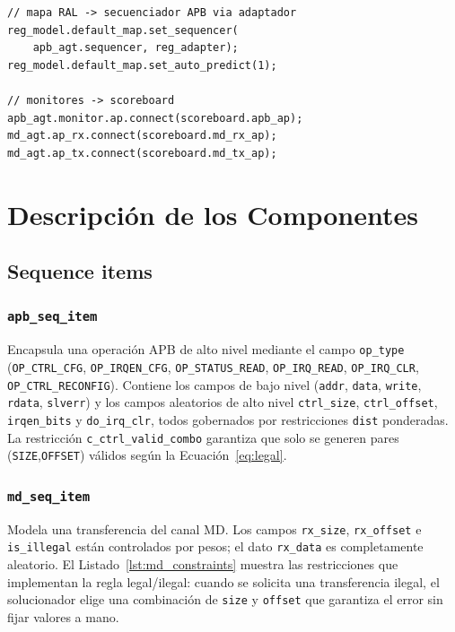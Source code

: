 \documentclass[conference]{IEEEtran}
\begin{document}
\begin{lstlisting}[caption={Conexiones del RAL y los puertos de análisis en el environment},label={lst:env}]
// mapa RAL -> secuenciador APB via adaptador
reg_model.default_map.set_sequencer(
    apb_agt.sequencer, reg_adapter);
reg_model.default_map.set_auto_predict(1);

// monitores -> scoreboard
apb_agt.monitor.ap.connect(scoreboard.apb_ap);
md_agt.ap_rx.connect(scoreboard.md_rx_ap);
md_agt.ap_tx.connect(scoreboard.md_tx_ap);
\end{lstlisting}

\section{Descripción de los Componentes}

\subsection{Sequence items}
\subsubsection{\texttt{apb\_seq\_item}}
Encapsula una operación APB de alto nivel mediante el campo \texttt{op\_type}
(\texttt{OP\_CTRL\_CFG}, \texttt{OP\_IRQEN\_CFG}, \texttt{OP\_STATUS\_READ},
\texttt{OP\_IRQ\_READ}, \texttt{OP\_IRQ\_CLR}, \texttt{OP\_CTRL\_RECONFIG}).
Contiene los campos de bajo nivel (\texttt{addr}, \texttt{data}, \texttt{write},
\texttt{rdata}, \texttt{slverr}) y los campos aleatorios de alto nivel
\texttt{ctrl\_size}, \texttt{ctrl\_offset}, \texttt{irqen\_bits} y
\texttt{do\_irq\_clr}, todos gobernados por restricciones \texttt{dist}
ponderadas. La restricción \texttt{c\_ctrl\_valid\_combo} garantiza que solo se
generen pares (\texttt{SIZE},\texttt{OFFSET}) válidos según la
Ecuación~\eqref{eq:legal}.

\subsubsection{\texttt{md\_seq\_item}}
Modela una transferencia del canal MD. Los campos \texttt{rx\_size},
\texttt{rx\_offset} e \texttt{is\_illegal} están controlados por pesos; el dato
\texttt{rx\_data} es completamente aleatorio. El Listado~\ref{lst:md_constraints}
muestra las restricciones que implementan la regla legal/ilegal: cuando se
solicita una transferencia ilegal, el solucionador elige una combinación de
\texttt{size} y \texttt{offset} que garantiza el error sin fijar valores a mano.
\end{document}
